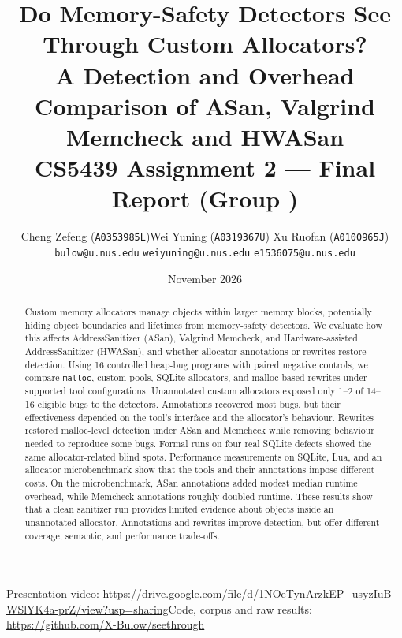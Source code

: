 \documentclass[10pt,a4paper]{article}
\title{\textbf{Do Memory-Safety Detectors See Through Custom Allocators?}\\[2pt]
\large A Detection and Overhead Comparison of ASan, Valgrind Memcheck and HWASan\\[4pt]
\normalsize CS5439 Assignment 2 --- Final Report (Group \groupnumber)}
\author{Cheng Zefeng (\texttt{A0353985L})\quad Wei Yuning (\texttt{A0319367U}) \quad Xu Ruofan (\texttt{A0100965J})\\
\small\texttt{bulow@u.nus.edu} \quad \texttt{weiyuning@u.nus.edu} \quad \texttt{e1536075@u.nus.edu}}
\date{November 2026}
\newcommand{\videolink}{\url{https://drive.google.com/file/d/1NOeTynArzkEP_usyzIuB-WSlYK4a-prZ/view?usp=sharing}}
\newcommand{\repourl}{\url{https://github.com/X-Bulow/seethrough}}
\newcommand{\code}[1]{\texttt{#1}}
\begin{document}
\maketitle
\vspace{-1.5em}
\begin{center}\small
Presentation video: \videolink \qquad Code, corpus and raw results: \repourl
\end{center}

\begin{abstract}
\noindent
Custom memory allocators manage objects within larger memory blocks, potentially hiding object boundaries and lifetimes from memory-safety detectors. We evaluate how this affects AddressSanitizer (ASan), Valgrind Memcheck, and Hardware-assisted AddressSanitizer (HWASan), and whether allocator annotations or rewrites restore detection. Using 16 controlled heap-bug programs with paired negative controls, we compare \code{malloc}, custom pools, SQLite allocators, and malloc-based rewrites under supported tool configurations. Unannotated custom allocators exposed only 1--2 of 14--16 eligible bugs to the detectors. Annotations recovered most bugs, but their effectiveness depended on the tool's interface and the allocator's behaviour. Rewrites restored malloc-level detection under ASan and Memcheck while removing behaviour needed to reproduce some bugs. Formal runs on four real SQLite defects showed the same allocator-related blind spots. Performance measurements on SQLite, Lua, and an allocator microbenchmark show that the tools and their annotations impose different costs. On the microbenchmark, ASan annotations added modest median runtime overhead, while Memcheck annotations roughly doubled runtime. These results show that a clean sanitizer run provides limited evidence about objects inside an unannotated allocator. Annotations and rewrites improve detection, but offer different coverage, semantic, and performance trade-offs.
\end{abstract}











\begingroup
\small
\raggedright

\endgroup

\appendix

\end{document}
